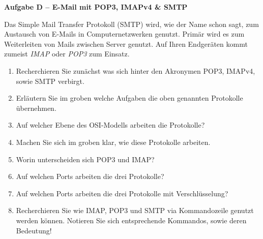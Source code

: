 \documentclass[paper=a4,fontsize=11pt]{scrartcl}%
\numberwithin{equation}{section}
\begin{document}
\begin{center}\Large{\textbf{Aufgabe D -- E-Mail mit POP3, IMAPv4 \& SMTP}}\end{center}\vskip0.2in
Das Simple Mail Transfer Protokoll (SMTP) wird, wie der Name schon sagt, zum Austausch von E-Mails in Computernetzwerken genutzt. Primär wird es zum Weiterleiten von Mails zwischen Server genutzt. Auf Ihren Endgeräten kommt zumeist \emph{IMAP} oder \emph{POP3} zum Einsatz. 
\begin{enumerate}
	\item Recherchieren Sie zunächst was sich hinter den Akronymen POP3, IMAPv4, sowie SMTP verbirgt.
	\item Erläutern Sie im groben welche Aufgaben die oben genannten Protokolle übernehmen.
	\item Auf welcher Ebene des OSI-Modells arbeiten die Protokolle?
	\item Machen Sie sich im groben klar, wie diese Protokolle arbeiten.	
	\item Worin unterscheiden sich POP3 und IMAP?
	\item Auf welchen Ports arbeiten die drei Protokolle?
	\item Auf welchen Ports arbeiten die drei Protokolle mit Verschlüsselung?
	\item Recherchieren Sie wie IMAP, POP3 und SMTP via Kommandozeile genutzt werden können. Notieren Sie sich entsprechende Kommandos, sowie deren Bedeutung!
\end{enumerate}
\end{document}
